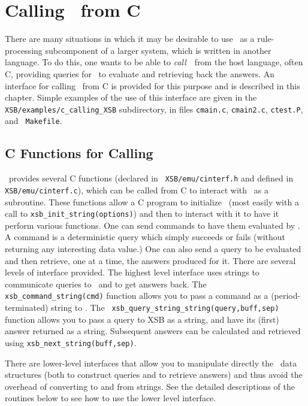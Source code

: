\chapter{Calling \ourprolog\ from C}
\label{ccallingxsb}

There are many situations in which it may be desirable to use
\ourprolog\ as a rule-processing subcomponent of a larger system,
which is written in another language.  To do this, one wants to be
able to {\em call}\ \ourprolog\ from the host language, often C,
providing queries for \ourprolog\ to evaluate and retrieving back the
answers.  An interface for calling \ourprolog\ from C is provided for
this purpose and is described in this chapter.  Simple examples of
the use of this interface are given in the {\tt XSB/examples/c\_calling\_XSB}
subdirectory, in files {\tt cmain.c}, {\tt cmain2.c}, {\tt ctest.P}, and {\tt
Makefile}.

\section{C Functions for Calling \ourprolog}

\ourprolog\ provides several C functions (declared in {\tt
XSB/emu/cinterf.h} and defined in \\ {\tt XSB/emu/cinterf.c}), which can
be called from C to interact with \ourprolog\ as a subroutine. These
functions allow a C program to initialize \ourprolog\ (most easily with
a call to {\tt xsb\_init\_string(options)}) and then to interact with it
to have it perform various functions.  One can send commands to have
them evaluated by \ourprolog .  A command is a deterministic query which
simply succeeds or fails (without returning any interesting data value.)
One can also send a query to be evaluated and then retrieve, one at a
time, the answers produced for it.  There are several levels of
interface provided.  The highest level interface uses strings to
communicate queries to \ourprolog\ and to get answers back.  The {\tt
xsb\_command\_string(cmd)} function allows you to pass a command as a
(period-terminated) string to \ourprolog .  The {\tt
xsb\_query\_string\_string(query,buff,sep)} function allows
you to pass a query to XSB as a string, and have its (first) answer
returned as a string.  Subsequent answers can be calculated and
retrieved using {\tt xsb\_next\_string(buff,sep)}.

There are lower-level interfaces that allow you to manipulate directly
the \ourprolog\ data structures (both to construct queries and to
retrieve answers) and thus avoid the overhead of converting to and from
strings.  See the detailed descriptions of the routines below to see how
to use the lower level interface.

